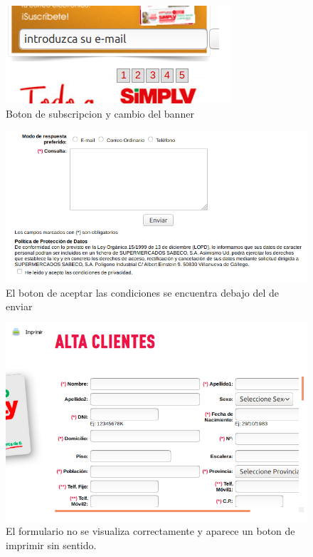 \documentclass[a4paper,11pt]{article}
\begin{document}
\begin{figure}[h!]
 \centering
 \includegraphics[scale=0.5]{bannerysubs.png}
 \caption{Boton de subscripcion y cambio del banner}
 \label{fig:bannerysubs}
\end{figure}

\begin{figure}[h!]
 \centering
 \includegraphics[scale=0.5]{formulariocondiciones.png}
 \caption{El boton de aceptar las condiciones se encuentra debajo del de enviar}
 \label{fig:formulariocondiciones}
\end{figure}

\begin{figure}[h!]
 \centering
 \includegraphics[scale=0.5]{imprimiryformulario.png}
 \caption{El formulario no se visualiza correctamente y aparece un boton de imprimir sin sentido.}
 \label{fig:imprimiryformulario}
\end{figure}
\end{document}
